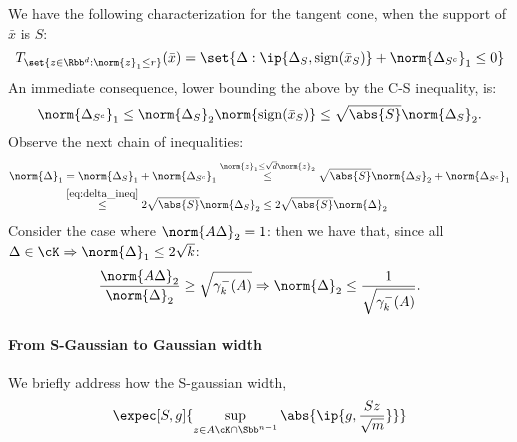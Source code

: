 \documentclass[a4paper]{article}
\begin{document}
We have the following characterization for the tangent cone, when the support of
$\bar{x}$ is $S$:
\[
    T_{\set{z \in \Rbb^d: \norm{z}_1 \leq r}}(\bar{x})
    = \set{\Delta: \ip{\Delta_S, \mathrm{sign}(\bar{x}_S)}
           + \norm{\Delta_{S^c}}_1 \leq 0}
\]
An immediate consequence, lower bounding the above by the C-S inequality, is:
\begin{equation}
    \norm{\Delta_{S^c}}_1 \leq \norm{\Delta_S}_2 \norm{\mathrm{sign}(\bar{x}_S)}
    \leq \sqrt{\abs{S}} \norm{\Delta_S}_2.
    \label{eq:delta_ineq}
\end{equation}
Observe the next chain of inequalities:
\begin{align*}
    \norm{\Delta}_1 &= \norm{\Delta_S}_1 + \norm{\Delta_{S^c}}_1
    \overset{\norm{z}_1 \leq \sqrt{d} \norm{z}_2}{\leq}
        \sqrt{\abs{S}} \norm{\Delta_S}_2 + \norm{\Delta_{S^c}}_1 \\
    &\overset{\eqref{eq:delta_ineq}}{\leq}
        2 \sqrt{\abs{S}} \norm{\Delta_S}_2 \leq 2 \sqrt{\abs{S}} \norm{\Delta}_2
\end{align*}
Consider the case where $\norm{A \Delta}_2 = 1$: then we have that, since all
$\Delta \in \cK \Rightarrow \norm{\Delta}_1 \leq 2 \sqrt{k}$:
\[
    \frac{\norm{A \Delta}_2}{\norm{\Delta}_2} \geq \sqrt{\gamma_k^-(A)}
    \Rightarrow \norm{\Delta}_2 \leq \frac{1}{\sqrt{\gamma_k^-(A)}}.
\]

\paragraph{From S-Gaussian to Gaussian width}
We briefly address how the S-gaussian width,
\[
	\expec[S, g]{\sup_{z \in A \cK \cap \Sbb^{n-1}}
		\abs{\ip{g, \frac{Sz}{\sqrt{m}}}}}
\]
\end{document}
